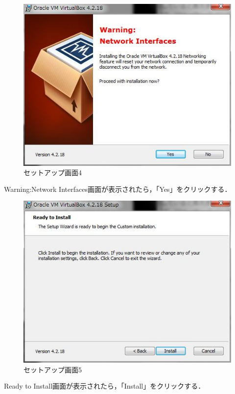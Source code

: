 \begin{figure}[H]
\centering
\includegraphics[width=13cm]{Warning.jpg}
\caption{セットアップ画面4}\label{サンプル図}
\end{figure}

Warning:Network Interfaces画面が表示されたら，「Yes」をクリックする．

\begin{figure}[H]
\centering
\includegraphics[width=13cm]{Install.jpg}
\caption{セットアップ画面5}\label{サンプル図}
\end{figure}

Ready to Install画面が表示されたら，「Install」をクリックする．

